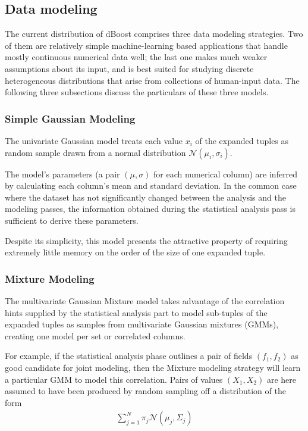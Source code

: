 \subsection{Data modeling}
\label{sec:model-creation}

The current distribution of dBoost comprises three data modeling strategies. Two of them are relatively simple machine-learning based applications that handle mostly continuous numerical data well; the last one makes much weaker assumptions about its input, and is best suited for studying discrete heterogeneous distributions that arise from collections of human-input data. The following three subsections discuss the particulars of these three models.

\subsubsection{Simple Gaussian Modeling}
\label{sec:gaus_model}
The univariate Gaussian model treats each value $x_i$ of the expanded tuples as random sample drawn from a normal distribution $\mathcal N(\mu_i, \sigma_i)$.

The model's parameters (a pair $(\mu, \sigma)$ for each numerical column) are inferred by calculating each column's mean and standard deviation. In the common case where the dataset has not significantly changed between the analysis and the modeling passes, the information obtained during the statistical analysis pass is sufficient to derive these parameters.

Despite its simplicity, this model presents the attractive property of requiring extremely little memory on the order of the size of one expanded tuple.

\subsubsection{Mixture Modeling}
The multivariate Gaussian Mixture model takes advantage of the correlation hints supplied by the statistical analysis part to model sub-tuples of the expanded tuples as samples from multivariate Gaussian mixtures (GMMs), creating one model per set or correlated columns.

For example, if the statistical analysis phase outlines a pair of fields $(f_1, f_2)$ as good candidate for joint modeling, then the Mixture modeling strategy will learn a particular GMM to model this correlation. Pairs of values $(X_1, X_2)$ are here assumed to have been produced by random sampling off a distribution of the form
\begin{align*}
\sum_{j=1}^{N} \pi_j \mathcal N(\mu_j, \Sigma_j)
\end{align*}

